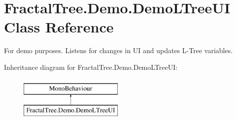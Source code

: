 \hypertarget{class_fractal_tree_1_1_demo_1_1_demo_l_tree_u_i}{}\section{Fractal\+Tree.\+Demo.\+Demo\+L\+Tree\+UI Class Reference}
\label{class_fractal_tree_1_1_demo_1_1_demo_l_tree_u_i}


For demo purposes. Listens for changes in UI and updates L-\/\+Tree variables.  


Inheritance diagram for Fractal\+Tree.\+Demo.\+Demo\+L\+Tree\+UI\+:\begin{figure}[H]
\begin{center}
\leavevmode
\includegraphics[height=2.000000cm]{class_fractal_tree_1_1_demo_1_1_demo_l_tree_u_i}
\end{center}
\end{figure}
